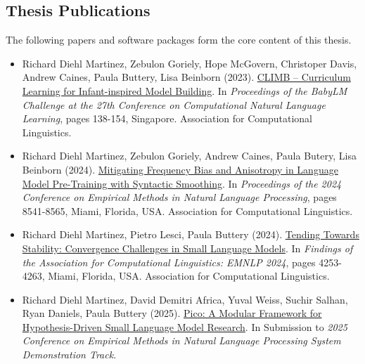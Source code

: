 \begin{tcolorbox}[
    enhanced,
    colback=white,
    colframe=thesisblue,
    arc=0mm,
    boxrule=1pt,
    left=10pt,
    right=10pt,
    top=10pt,
    bottom=10pt,
    title=Published Works,
    fonttitle=\bfseries,
    coltitle=white
]
\subsection*{Thesis Publications}
The following papers and software packages form the core content of this thesis.

\begin{itemize}
    \item Richard Diehl Martinez, Zebulon Goriely, Hope McGovern, Christoper Davis, Andrew Caines, Paula Buttery, Lisa Beinborn (2023). {\color{thesisblue}\href{https://aclanthology.org/2023.conll-1.10/}{CLIMB – Curriculum Learning for Infant-inspired Model Building}}. In \emph{Proceedings of the BabyLM Challenge at the 27th Conference on Computational Natural Language Learning}, pages 138-154, Singapore. Association for Computational Linguistics.

    \item Richard Diehl Martinez, Zebulon Goriely, Andrew Caines, Paula Butery, Lisa Beinborn (2024). {\color{thesisblue}\href{https://aclanthology.org/2024.emnlp-main.486/}{Mitigating Frequency Bias and Anisotropy in Language Model Pre-Training with Syntactic Smoothing}}. In \emph{Proceedings of the 2024 Conference on Empirical Methods in Natural Language Processing}, pages 8541-8565, Miami, Florida, USA. Association for Computational Linguistics.

    \item Richard Diehl Martinez, Pietro Lesci, Paula Buttery (2024). {\color{thesisblue}\href{https://aclanthology.org/2024.findings-emnlp.246/}{Tending Towards Stability: Convergence Challenges in Small Language Models}}. In \emph{Findings of the Association for Computational Linguistics: EMNLP 2024}, pages 4253-4263, Miami, Florida, USA. Association for Computational Linguistics.

    \item Richard Diehl Martinez, David Demitri Africa, Yuval Weiss, Suchir Salhan, Ryan Daniels, Paula Buttery (2025). {\color{thesisblue}\href{https://github.com/pico-lm}{Pico: A Modular Framework for Hypothesis-Driven Small Language Model Research}}. In Submission to \emph{2025 Conference on Empirical Methods in Natural Language Processing System Demonstration Track}.
\end{itemize}
\end{tcolorbox}

